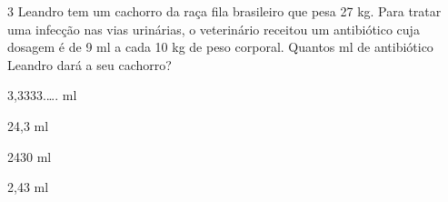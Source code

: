 








\num{3} Leandro tem um cachorro da raça fila brasileiro que pesa 27 kg. Para
tratar uma infecção nas vias urinárias, o veterinário receitou um
antibiótico cuja dosagem é de 9 ml a cada 10 kg de peso corporal.
Quantos ml de antibiótico Leandro dará a seu cachorro?
\item 3,3333.\ldots. ml
\item 24,3 ml
\item 2430 ml
\item 2,43 ml










